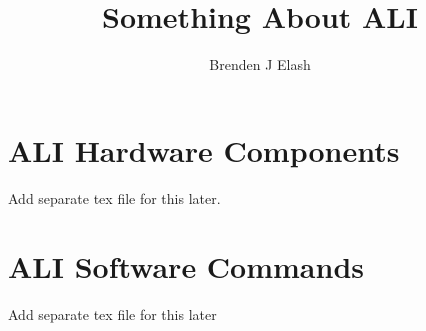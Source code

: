 \documentclass[11pt]{uofsthesis-cs}
\title{Something About ALI}
\author{Brenden J Elash}
\begin{document}
\maketitle

\frontmatter









\uofsappendix

\chapter{ALI Hardware Components}

Add separate tex file for this later.

\chapter{ALI Software Commands}

Add separate tex file for this later
\end{document}
